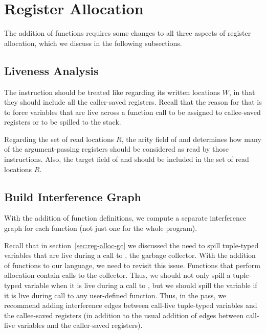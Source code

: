 \documentclass[7x10]{TimesAPriori_MIT}%
\numberwithin{theorem}{chapter}
\numberwithin{definition}{chapter}
\numberwithin{equation}{chapter}
\begin{document}
\section{Register Allocation}
\label{sec:register-allocation-r4}

The addition of functions requires some changes to all three aspects
of register allocation, which we discuss in the following subsections.

\subsection{Liveness Analysis}
\label{sec:liveness-analysis-r4}


The  instruction should be treated like
 regarding its written locations $W$, in that they should
include all the caller-saved registers. Recall that the reason for
that is to force variables that are live across a function call to be assigned to callee-saved
registers or to be spilled to the stack.

Regarding the set of read locations $R$, the arity field of
 and  determines how many of the
argument-passing registers should be considered as read by those
instructions. Also, the target field of  and
 should be included in the set of read locations
$R$.

\subsection{Build Interference Graph}
\label{sec:build-interference-r4}

With the addition of function definitions, we compute a separate interference
graph for each function (not just one for the whole program).

Recall that in section~\ref{sec:reg-alloc-gc} we discussed the need to
spill tuple-typed variables that are live during a call to
, the garbage collector.  With the addition of functions
to our language, we need to revisit this issue. Functions that perform
allocation contain calls to the collector. Thus, we should not only
spill a tuple-typed variable when it is live during a call to
, but we should spill the variable if it is live during
call to any user-defined function. Thus, in the
 pass, we recommend adding interference
edges between call-live tuple-typed variables and the callee-saved
registers (in addition to the usual addition of edges between
call-live variables and the caller-saved registers).
\end{document}
